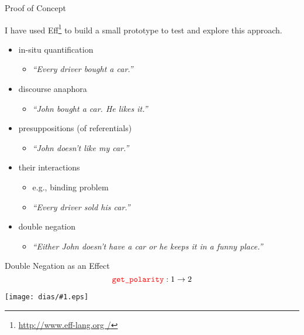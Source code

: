 \documentclass{beamer}
\newcommand{\mycolord}[1]{\textcolor{myColor2}{#1}}
\newcommand{\includepicturescale}[2]{
    \texttt{[image: dias/\#1.eps]}
}
\begin{document}
\begin{frame}{Proof of Concept}
  \vfill

  I have used Eff\footnote{\url{http://www.eff-lang.org /}} to build a
  small prototype to test and explore this approach.
  
  \vfill
  \begin{itemize}
  \item in-situ quantification
    \begin{itemize}
    \item \textit{``Every driver bought a car.''}
    \end{itemize}
  \item discourse anaphora
    \begin{itemize}
    \item \textit{``John bought a car. He likes it.''}
    \end{itemize}
  \item presuppositions (of referentials)
    \begin{itemize}
    \item \textit{``John doesn't like my car.''}
    \end{itemize}
  \item their interactions
    \begin{itemize}
    \item e.g., binding problem
    \item \textit{``Every driver sold his car.''}
    \end{itemize}
  \vfill
  \pause
  \item \mycolord{double negation}
    \begin{itemize}
    \item \textit{``Either John doesn't have a car or he keeps it in a
      funny place.''}
    \end{itemize}
  \end{itemize}
\end{frame}



\begin{frame}{Double Negation as an Effect}
  $$\textcolor{red}{\texttt{get\_polarity}} : 1 \to 2$$
  \vfill
  \begin{center}
  \includepicturescale{double_negation}{0.4}
  \end{center}
\end{frame}
\end{document}

